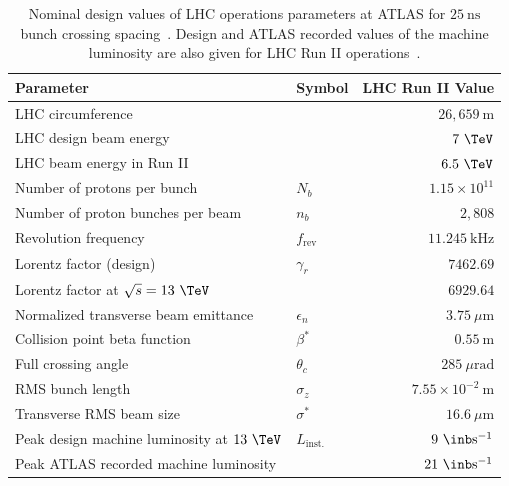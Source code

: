 \begin{table}[htpb]
 \centering
 \caption{
  Nominal design values of LHC operations parameters at ATLAS for $25~\textrm{ns}$ bunch crossing spacing~\cite{Evans:2008zzb,PhysRevAccelBeams.19.101003}.
  Design and ATLAS recorded values of the machine luminosity are also given for LHC Run II operations~\cite{TWiki:2018ATLASPeakLumi}.
 }
 \begin{tabular}{@{}llr@{}} \toprule
  Parameter                                   & Symbol             & LHC Run II Value                \\ \midrule
  LHC circumference                           &                    & $26,659~\mathrm{m}$             \\
  LHC design beam energy                      &                    & $7~\TeV$                        \\
  LHC beam energy in Run II                   &                    & $6.5~\TeV$                      \\
  Number of protons per bunch                 & $N_{b}$            & $1.15 \times 10^{11}$           \\
  Number of proton bunches per beam           & $n_{b}$            & $2,808$                         \\
  Revolution frequency                        & $f_{\textrm{rev}}$ & $11.245~\mathrm{kHz}$           \\
  Lorentz factor (design)                     & $\gamma_{r}$       & $7462.69$                       \\
  Lorentz factor at $\sqrt{s} = 13~\TeV$      &                    & $6929.64$                       \\
  Normalized transverse beam emittance        & $\epsilon_{n}$     & $3.75~\mu\mathrm{m}$            \\
  Collision point beta function               & $\beta^{*}$        & $0.55~\mathrm{m}$               \\
  Full crossing angle                         & $\theta_{c}$       & $285~\mu\mathrm{rad}$           \\
  RMS bunch length                            & $\sigma_{z}$       & $7.55\times 10^{-2}~\mathrm{m}$ \\
  Transverse RMS beam size                    & $\sigma^{*}$       & $16.6~\mu\mathrm{m}$            \\ \midrule
  Peak design machine luminosity at $13~\TeV$ & $L_{\text{inst.}}$ & $9~\inb\mathrm{s}^{-1}$         \\
  Peak ATLAS recorded machine luminosity      &                    & $21~\inb\mathrm{s}^{-1}$        \\
  \bottomrule
 \end{tabular}\label{table:nominal_values}
\end{table}

